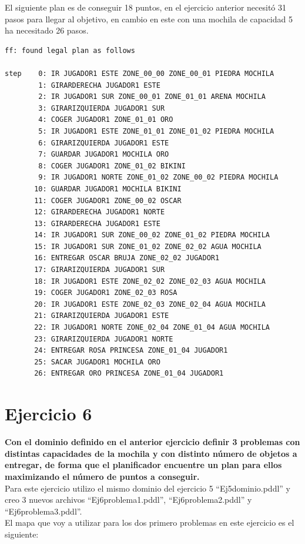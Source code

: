 \documentclass[12pt]{article}
\begin{document}
El siguiente plan es de conseguir 18 puntos, en el ejercicio anterior necesitó 31 pasos para llegar al objetivo, en cambio en este con una mochila de capacidad 5 ha necesitado 26 pasos.
\begin{verbatim}
ff: found legal plan as follows

step    0: IR JUGADOR1 ESTE ZONE_00_00 ZONE_00_01 PIEDRA MOCHILA
        1: GIRARDERECHA JUGADOR1 ESTE
        2: IR JUGADOR1 SUR ZONE_00_01 ZONE_01_01 ARENA MOCHILA
        3: GIRARIZQUIERDA JUGADOR1 SUR
        4: COGER JUGADOR1 ZONE_01_01 ORO
        5: IR JUGADOR1 ESTE ZONE_01_01 ZONE_01_02 PIEDRA MOCHILA
        6: GIRARIZQUIERDA JUGADOR1 ESTE
        7: GUARDAR JUGADOR1 MOCHILA ORO
        8: COGER JUGADOR1 ZONE_01_02 BIKINI
        9: IR JUGADOR1 NORTE ZONE_01_02 ZONE_00_02 PIEDRA MOCHILA
       10: GUARDAR JUGADOR1 MOCHILA BIKINI
       11: COGER JUGADOR1 ZONE_00_02 OSCAR
       12: GIRARDERECHA JUGADOR1 NORTE
       13: GIRARDERECHA JUGADOR1 ESTE
       14: IR JUGADOR1 SUR ZONE_00_02 ZONE_01_02 PIEDRA MOCHILA
       15: IR JUGADOR1 SUR ZONE_01_02 ZONE_02_02 AGUA MOCHILA
       16: ENTREGAR OSCAR BRUJA ZONE_02_02 JUGADOR1
       17: GIRARIZQUIERDA JUGADOR1 SUR
       18: IR JUGADOR1 ESTE ZONE_02_02 ZONE_02_03 AGUA MOCHILA
       19: COGER JUGADOR1 ZONE_02_03 ROSA
       20: IR JUGADOR1 ESTE ZONE_02_03 ZONE_02_04 AGUA MOCHILA
       21: GIRARIZQUIERDA JUGADOR1 ESTE
       22: IR JUGADOR1 NORTE ZONE_02_04 ZONE_01_04 AGUA MOCHILA
       23: GIRARIZQUIERDA JUGADOR1 NORTE
       24: ENTREGAR ROSA PRINCESA ZONE_01_04 JUGADOR1
       25: SACAR JUGADOR1 MOCHILA ORO
       26: ENTREGAR ORO PRINCESA ZONE_01_04 JUGADOR1

\end{verbatim}


\section{Ejercicio 6} \textbf{Con el dominio definido en el anterior ejercicio definir 3 problemas con
distintas capacidades de la mochila y con distinto número de objetos a entregar, de
forma que el planificador encuentre un plan para ellos maximizando el número de
puntos a conseguir.}\\

Para este ejercicio utilizo el mismo dominio del ejercicio 5 ``Ej5dominio.pddl'' y creo 3 nuevos archivos ``Ej6problema1.pddl'', ``Ej6problema2.pddl'' y ``Ej6problema3.pddl''.\\

El mapa que voy a utilizar para los dos primero problemas en este ejercicio es el siguiente:
\end{document}
